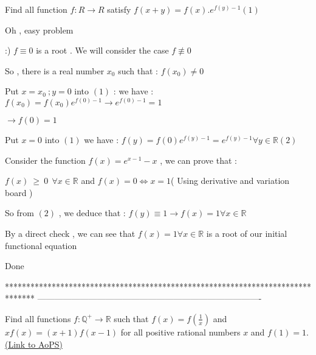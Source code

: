 \begin{solution}
	\begin{tcolorbox}Find all function $ f: R\to R$ satisfy $ f(x + y) = f(x).e^{f(y) - 1} (1)$\end{tcolorbox}
        \begin{italicized}  Oh , easy problem 

 :)   $ f \equiv 0$ is a root  . We will consider the case $ f \not \equiv 0$

      So , there is a real number $ x_0$ such that : $ f(x_0) \neq 0$

   Put $ x = x_0 \ ; y = 0$ into $ (1)$ : we have : $ f(x_0) = f(x_0)e^{f(0) - 1} \rightarrow e^{f(0) - 1} = 1$

  $ \boxed{\rightarrow f(0) = 1}$

  Put $ x = 0$ into $ (1)$ we have : $ f(y) = f(0)e^{f(y) - 1} = e^{f(y) - 1} \forall y \in \mathbb{R} (2)$

   Consider the function $ f(x) = e^{x - 1} - x$ , we can prove that :

   $ f(x) \ \geq \ 0 \ \ \forall x \in \mathbb{R}$ and  $ f(x) = 0 \iff x = 1$( Using derivative and variation board )

   So from $ (2)$ , we deduce that : $ f(y) \equiv 1 \rightarrow f(x) = 1 \forall x \in \mathbb{R}$ 

  By a direct check , we can see that $ f(x) = 1 \forall x \in \mathbb{R}$ is a root of our initial functional equation

    Done   \end{italicized}
\end{solution}
*******************************************************************************
-------------------------------------------------------------------------------

\begin{problem}
	Find all functions $ f: \mathbb{Q}^{+}\to \mathbb{R}$ such that $ f\left(x\right)=f\left(\frac{1}{x}\right)$ and $ xf\left(x\right)=\left(x+1\right)f\left(x-1\right)$ for all positive rational numbers $ x$ and $ f\left(1\right)=1$.
	\flushright \href{https://artofproblemsolving.com/community/c6h305160}{(Link to AoPS)}
\end{problem}



